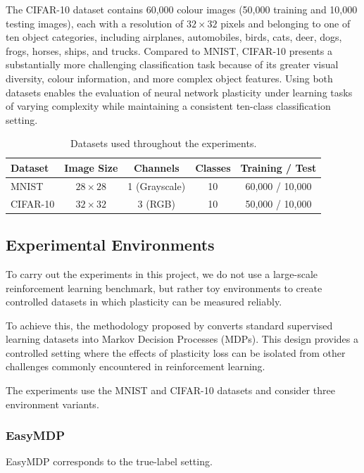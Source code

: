 The CIFAR-10 dataset contains 60,000 colour images (50,000 training and 10,000 testing images), each with a resolution of $32 \times 32$ pixels and belonging to one of ten object categories, including airplanes, automobiles, birds, cats, deer, dogs, frogs, horses, ships, and trucks. Compared to MNIST, CIFAR-10 presents a substantially more challenging classification task because of its greater visual diversity, colour information, and more complex object features. Using both datasets enables the evaluation of neural network plasticity under learning tasks of varying complexity while maintaining a consistent ten-class classification setting.
\begin{table}[h]
\centering
\caption{Datasets used throughout the experiments.}
\label{tab:datasets}
\begin{tabular}{lcccc}
\toprule
Dataset & Image Size & Channels & Classes & Training / Test \\
\midrule
MNIST & $28 \times 28$ & 1 (Grayscale) & 10 & 60,000 / 10,000 \\
CIFAR-10 & $32 \times 32$ & 3 (RGB) & 10 & 50,000 / 10,000 \\
\bottomrule
\end{tabular}
\end{table}

\subsection{Experimental Environments}

To carry out the experiments in this project, we do not use a large-scale reinforcement learning benchmark, but rather toy environments to create controlled datasets in which plasticity can be measured reliably.

To achieve this, the methodology proposed by \citep{lyle2023understanding} converts standard supervised learning datasets into Markov Decision Processes (MDPs). This design provides a controlled setting where the effects of plasticity loss can be isolated from other challenges commonly encountered in reinforcement learning.

The experiments use the MNIST and CIFAR-10 datasets and consider three environment variants.

\subsubsection{EasyMDP}

EasyMDP corresponds to the true-label setting.

